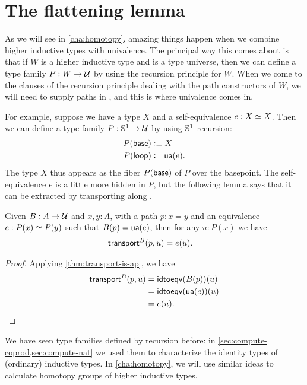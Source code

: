 \section{The flattening lemma}
\label{sec:flattening}

As we will see in \autoref{cha:homotopy}, amazing things happen when we combine higher inductive types with univalence.
The principal way this comes about is that if $W$ is a higher inductive type and \UU is a type universe, then we can define a type family $P:W\to \mathcal{U}$ by using the recursion principle for $W$.
When we come to the clauses of the recursion principle dealing with the path constructors of $W$, we will need to supply paths in \UU, and this is where univalence comes in.

For example, suppose we have a type $X$ and a self-equivalence $e:X \simeq X$.
Then we can define a type family $P:\mathbb{S}^1 \to \mathcal{U}$ by using $\mathbb{S}^1$-recursion:
\begin{align*}
  P(\mathsf{base}) &\vcentcolon\equiv X\\
  {P}({\mathsf{loop}}) &\coloneqq \mathsf{ua}(e).
\end{align*}
The type $X$ thus appears as the fiber $P(\mathsf{base})$ of $P$ over the basepoint.
The self-equivalence $e$ is a little more hidden in $P$, but the following lemma says that it can be extracted by transporting along \lloop.

\begin{lem}\label{thm:transport-is-given}
  Given $B:A\to\mathcal{U}$ and $x,y:A$, with a path $p:x=y$ and an equivalence $e:P(x) \simeq P(y)$ such that ${B}({p}) = \mathsf{ua}(e)$, then for any $u:P(x)$ we have
  \begin{align*}
    \mathsf{transport}^{B}(p,u) &= e(u).
  \end{align*}
\end{lem}
\begin{proof}
  Applying \autoref{thm:transport-is-ap}, we have
  \begin{align*}
    \mathsf{transport}^{B}(p,u) &= \mathsf{idtoeqv}({B}({p}))(u)\\
    &= \mathsf{idtoeqv}(\mathsf{ua}(e))(u)\\
    &= e(u).\qedhere
  \end{align*}
\end{proof}

We have seen type families defined by recursion before: in \autoref{sec:compute-coprod,sec:compute-nat} we used them to characterize the identity types of (ordinary) inductive types.
In \autoref{cha:homotopy}, we will use similar ideas to calculate homotopy groups of higher inductive types.


